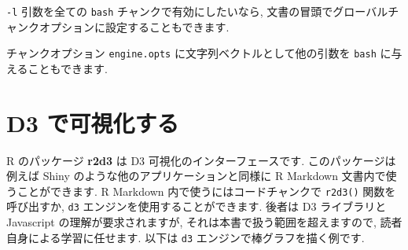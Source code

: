 \documentclass[
  11pt,
  lualatex,ja=standard,jafont=noto]{bxjsreport}
\newenvironment{Shaded}{\begin{snugshade}}{\end{snugshade}}
\newcommand{\AttributeTok}[1]{\textcolor[rgb]{0.77,0.63,0.00}{#1}}
\newcommand{\FunctionTok}[1]{\textcolor[rgb]{0.00,0.00,0.00}{#1}}
\newcommand{\InformationTok}[1]{\textcolor[rgb]{0.56,0.35,0.01}{\textbf{\textit{#1}}}}
\newcommand{\NormalTok}[1]{#1}
\newcommand{\SpecialCharTok}[1]{\textcolor[rgb]{0.00,0.00,0.00}{#1}}
\newcommand{\StringTok}[1]{\textcolor[rgb]{0.31,0.60,0.02}{#1}}
\begin{document}
\begin{Shaded}
\end{Shaded}

\texttt{-l} 引数を全ての \texttt{bash} チャンクで有効にしたいなら, 文書の冒頭でグローバルチャンクオプションに設定することもできます.

\begin{Shaded}
\end{Shaded}

チャンクオプション \texttt{engine.opts} に文字列ベクトルとして他の引数を \texttt{bash} に与えることもできます.

\hypertarget{d3}{%
\section{D3 で可視化する}\label{d3}}

R のパッケージ \textbf{r2d3} \autocite{R-r2d3} は D3 可視化のインターフェースです. このパッケージは例えば Shiny のような他のアプリケーションと同様に R Markdown 文書内で使うことができます. R Markdown 内で使うにはコードチャンクで \texttt{r2d3()} 関数を呼び出すか, \texttt{d3} エンジンを使用することができます. 後者は D3 ライブラリと Javascript の理解が要求されますが, それは本書で扱う範囲を超えますので, 読者自身による学習に任せます. 以下は \texttt{d3} エンジンで棒グラフを描く例です.
\end{document}
